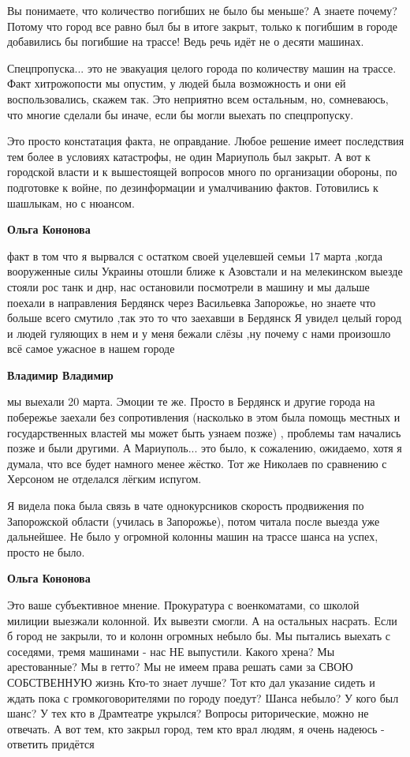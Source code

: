 \begin{itemize}
Вы понимаете, что количество погибших не было бы меньше? А знаете почему?
Потому что город все равно был бы в итоге закрыт, только к погибшим в городе
добавились бы погибшие на трассе! Ведь речь идёт не о десяти машинах.

Спецпропуска... это не эвакуация целого города по количеству машин на трассе.
Факт хитрожопости мы опустим, у людей была возможность и они ей
воспользовались, скажем так. Это неприятно всем остальным, но, сомневаюсь, что
многие сделали бы иначе, если бы могли выехать по спецпропуску.

Это просто констатация факта, не оправдание. Любое решение имеет последствия
тем более в условиях катастрофы, не один Мариуполь был закрыт. А вот к
городской власти и к вышестоящей вопросов много по организации обороны, по
подготовке к войне, по дезинформации и умалчиванию фактов. Готовились к
шашлыкам, но с нюансом.

\textbf{Ольга Кононова} 

факт в том что я вырвался с остатком своей уцелевшей семьи 17 марта ,когда
вооруженные силы Украины отошли ближе к Азовстали и на мелекинском выезде
стояли рос танк и днр, нас остановили посмотрели в машину и мы дальше поехали в
направления Бердянск через Васильевка Запорожье, но знаете что больше всего
смутило ,так это то что заехавши в Бердянск Я увидел целый город и людей
гуляющих в нем и у меня бежали слёзы ,ну почему с нами произошло всё самое
ужасное в нашем городе

\textbf{Владимир Владимир} 

мы выехали 20 марта. Эмоции те же. Просто в Бердянск и другие города на
побережье заехали без сопротивления (насколько в этом была помощь местных и
государственных властей мы может быть узнаем позже) , проблемы там начались
позже и были другими. А Мариуполь... это было, к сожалению, ожидаемо, хотя я
думала, что все будет намного менее жёстко. Тот же Николаев по сравнению с
Херсоном не отделался лёгким испугом.

Я видела пока была связь в чате однокурсников скорость продвижения по
Запорожской области (училась в Запорожье), потом читала после выезда уже
дальнейшее. Не было у огромной колонны машин на трассе шанса на успех, просто
не было.

\textbf{Ольга Кононова} 

\obeycr
Это ваше субъективное мнение.
Прокуратура с военкоматами, со школой милиции выезжали колонной.
Их вывезти смогли. А на остальных насрать.
Если б город не закрыли, то и колонн огромных небыло бы.
Мы пытались выехать с соседями, тремя машинами - нас НЕ выпустили.
Какого хрена? Мы арестованные? Мы в гетто? Мы не имеем права решать сами за СВОЮ СОБСТВЕННУЮ жизнь
Кто-то знает лучше? Тот кто дал указание сидеть и ждать пока с громкоговорителями по городу поедут?
Шанса небыло?
У кого был шанс? У тех кто в Драмтеатре укрылся?
Вопросы риторические, можно не отвечать.
А вот тем, кто закрыл город, тем кто врал людям, я очень надеюсь - ответить придётся
\restorecr


\end{itemize}
